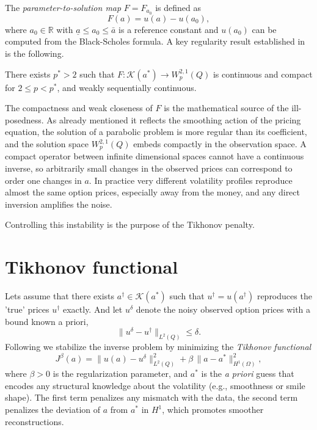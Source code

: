 The \emph{parameter-to-solution map} $F = F_{a_0}$ is defined as
\begin{equation}\label{eq:param_solution_map}
    F(a) = u(a) - u(a_0),
\end{equation}
where $a_0 \in \mathbb{R}$ with $\underline{a} \le a_0 \le \bar{a}$ is a reference constant
and $u(a_0)$ can be computed from the Black-Scholes formula.
A key regularity result established in \cite{egger2005tikhonov} is the following.

\begin{theorem}
There exists $p^* > 2$ such that $F\colon \mathcal{K}(a^*) \to W_p^{2,1}(Q)$
is continuous and compact for $2 \le p < p^*$, and weakly sequentially continuous.
\end{theorem}

The compactness and weak closeness of $F$ is the mathematical source of the ill-posedness.
As already mentioned it reflects the smoothing action of the pricing equation,
the solution of a parabolic problem is more regular than its coefficient,
and the solution space $W_p^{2,1}(Q)$ embeds compactly in the observation space.
A compact operator between infinite dimensional spaces cannot have a continuous inverse,
so arbitrarily small changes in the observed prices can correspond to order one changes in $a$.
In practice very different volatility profiles reproduce almost the same option prices, especially away from the money,
and any direct inversion amplifies the noise.

Controlling this instability is the purpose of the Tikhonov penalty.


\section{Tikhonov functional}

Lets assume that there exists $a^\dagger \in \mathcal{K}(a^*)$ such that $u^\dagger = u(a^\dagger)$ reproduces the 'true' prices $u^\dagger$ exactly.
And let $u^\delta$ denote the noisy observed option prices with a bound known a priori,
\begin{equation*}
    \|u^\delta - u^\dagger\|_{L^2(Q)} \le \delta.
\end{equation*}
Following \cite{egger2005tikhonov} we stabilize the inverse problem by minimizing the
\emph{Tikhonov functional}
\begin{equation}\label{eq:tikhonov_functional}
    J^\beta(a) = \|u(a) - u^\delta\|^2_{L^2(Q)} + \beta\,\|a - a^*\|^2_{H^1(\Omega)},
\end{equation}
where $\beta > 0$ is the regularization parameter,
and $a^*$ is the \emph{a priori} guess that encodes any structural knowledge about the volatility (e.g., smoothness or smile shape).
The first term penalizes any mismatch with the data,
the second term penalizes the deviation of $a$ from $a^*$ in $H^1$,
which promotes smoother reconstructions.

